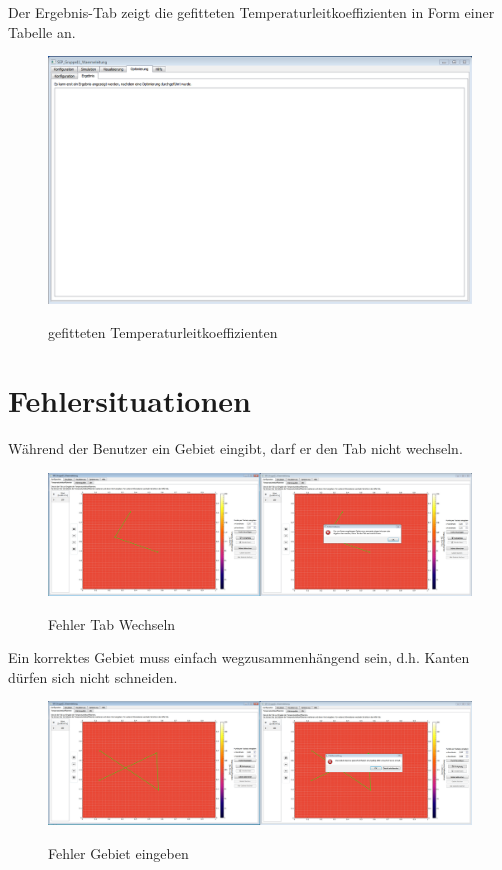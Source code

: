 Der Ergebnis-Tab zeigt die gefitteten Temperaturleitkoeffizienten in Form einer Tabelle an.
\begin{figure}[H]
\centering
\includegraphics[scale=.25]{Benutzerdokumentation/ErgebnisAnzeigen.png}\\
\caption{gefitteten Temperaturleitkoeffizienten}
\label{ErgebnisAnzeigen}
\end{figure}



\newpage
\section{Fehlersituationen}

Während der Benutzer ein Gebiet eingibt, darf er den Tab nicht wechseln.
\begin{figure}[H]
\centering
\includegraphics[scale=.25]{Benutzerdokumentation/FehlerTabWechseln.png}\\
\caption{Fehler Tab Wechseln}
\label{FehlerTabWechseln}
\end{figure}

\noindent
Ein korrektes Gebiet muss einfach wegzusammenhängend sein, d.h. Kanten dürfen sich nicht schneiden.
\begin{figure}[H]
\centering
\includegraphics[scale=.25]{Benutzerdokumentation/FehlerGebietEingeben.png}\\
\caption{Fehler Gebiet eingeben}
\label{FehlerGebietEingeben}
\end{figure}